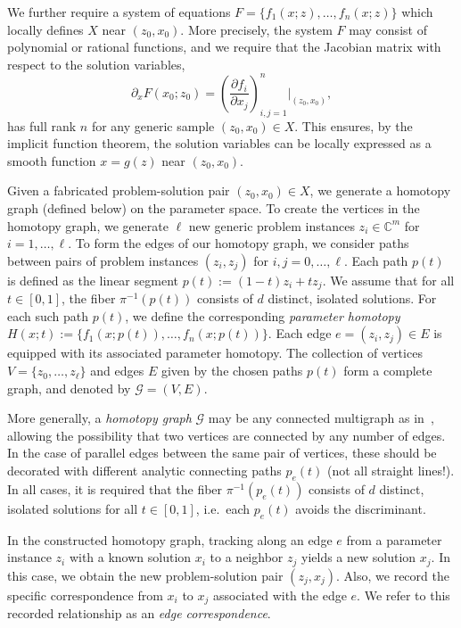 \documentclass[11pt]{amsart}
\let\oldtextit\textit
\renewcommand\emph[1]{\oldtextit{\color{blue}#1}}
\theoremstyle{definition}
\theoremstyle{remark}
\begin{document}
We further require a system of equations $F = \{f_1(x;z), \dots, f_n(x;z)\}$ which locally defines $X$ near $(z_0, x_0)$. More precisely, the system $F$ may consist of polynomial or rational  functions,
and we require that the Jacobian matrix with respect to the solution variables,
\[
\partial_xF(x_0;z_0) = \left(\frac{\partial f_i}{\partial x_j}\right)_{i,j=1}^n\bigg|_{(z_0, x_0)},
\]
has full rank $n$ for any generic sample $(z_0, x_0) \in X$. This ensures, by the implicit function theorem, the solution variables can be locally expressed as a smooth function $x = g(z)$ near $(z_0, x_0)$.

Given a fabricated problem-solution pair $(z_0, x_0) \in X$, we generate a homotopy graph (defined below) on the parameter space. To create the vertices in the homotopy graph, we generate $\ell$ new generic problem instances $z_i \in \mathbb{C}^m$ for $i=1, \dots, \ell$. To form the edges of our homotopy graph, we consider paths between pairs of problem instances $(z_i, z_j)$ for $i, j = 0, \dots, \ell$. Each path $p(t)$ is defined as the linear segment $p(t) := (1-t)z_i + t z_j$. We assume that for all $t \in [0, 1]$, the fiber $\pi^{-1}(p(t))$ consists of $d$ distinct, isolated solutions. For each such path $p(t)$, we define the corresponding \emph{parameter homotopy} $H(x; t) := \{f_1(x; p(t)), \dots, f_n(x; p(t))\}$. Each edge $e=(z_i,z_j)\in E$ is equipped with its associated parameter homotopy. The collection of vertices $V=\{z_0,\dots,z_\ell\}$ and edges $E$ given by the chosen paths $p(t)$ form a complete graph, and denoted by $\mathcal{G} = (V,E)$. 

More generally, a \emph{homotopy graph} $\mathcal{G}$ may be any connected multigraph as in~\cite{duff2019solving}, allowing the possibility that two vertices are connected by any number of edges. In the case of parallel edges between the same pair of vertices, these should be decorated with different analytic connecting paths $p_e(t)$ (not all straight lines!).
In all cases, it is required that the fiber $\pi^{-1}(p_e(t))$ consists of $d$ distinct, isolated solutions for all $t\in[0,1]$, i.e.~each $p_e(t)$ avoids the discriminant. 

In the constructed homotopy graph, tracking along an edge $e$ from a parameter instance $z_i$ with a known solution $x_i$ to a neighbor $z_j$ yields a new solution $x_j$. In this case, we obtain the new problem-solution pair $(z_j,x_j)$. Also, we record the specific correspondence from $x_i$ to $x_j$ associated with the edge $e.$ We refer to this recorded relationship as an \emph{edge correspondence}.
\end{document}
